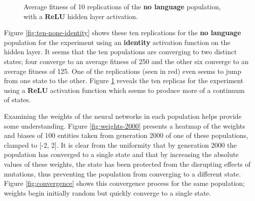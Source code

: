 \documentclass[12pt,a4paper]{report}
\begin{document}
\begin{figure}[t]
\begin{minipage}{0.49\textwidth}
          \caption{Average fitness of 10 replications of the {\bf no language} population, with a {\bf ReLU} hidden layer activation.}
          \label{fig:ten-none-relu}
   \end{minipage}
\end{figure}

Figure \ref{fig:ten-none-identity} shows these ten replications for the {\bf no language} population for the experiment using an {\bf identity} activation function on the hidden layer. It seems that the ten populations are converging to two distinct states; four converge to an average fitness of 250 and the other six converge to an average fitness of 125. One of the replications (seen in red) even seems to jump from one state to the other. Figure \ref{fig:ten-none-relu} reveals the ten replicas for the experiment using a {\bf ReLU} activation function which seems to produce more of a continuum of states.

Examining the weights of the neural networks in each population helps provide some understanding. Figure \ref{fig:weights-2000} presents a heatmap of the weights and biases of 100 entities taken from generation 2000 of one of these populations, clamped to [-2, 2]. It is clear from the uniformity that by generation 2000 the population has converged to a single state and that by increasing the absolute values of these weights, the state has been protected from the disrupting effects of mutations, thus preventing the population from converging to a different state. Figure \ref{fig:convergence} shows this convergence process for the same population; weights begin initially random but quickly converge to a single state.
\end{document}

